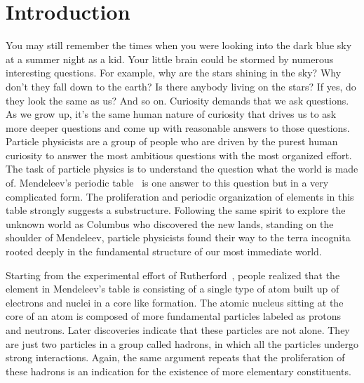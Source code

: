 \chapter{Introduction}
\label{chp:introduction}
You may still remember the times when you were looking into the dark blue sky at
a summer night as a kid. Your little brain could be stormed by numerous
interesting questions. For example, why are the stars shining in the sky? Why
don't they fall down to the earth? Is there anybody living on the stars? If yes,
do they look the same as us? And so on. Curiosity demands that we ask questions.
As we grow up, it's the same human nature of curiosity that drives us to ask
more deeper questions and come up with reasonable answers to those questions.
Particle physicists are a group of people who are driven by the purest human
curiosity to answer the most ambitious questions with the most organized effort.
The task of particle physics is to understand the question what the world is
made of. Mendeleev's periodic table~\cite{Mende:1869} is one answer to this
question but in a very complicated form. The proliferation and periodic
organization of elements in this table strongly suggests a substructure.
Following the same spirit to explore the unknown world as Columbus who
discovered the new lands, standing on the shoulder of Mendeleev, particle
physicists found their way to the terra incognita rooted deeply in the
fundamental structure of our most immediate world.

Starting from the experimental effort of Rutherford~\cite{Rutherford:1911},
people realized that the element in Mendeleev's table is consisting of a single
type of atom built up of electrons and nuclei in a core like formation. The
atomic nucleus sitting at the core of an atom is composed of more fundamental
particles labeled as protons and neutrons. Later discoveries indicate that these
particles are not alone. They are just two particles in a group called hadrons,
in which all the particles undergo strong interactions. Again, the same argument
repeats that the proliferation of these hadrons is an indication for the
existence of more elementary constituents.


